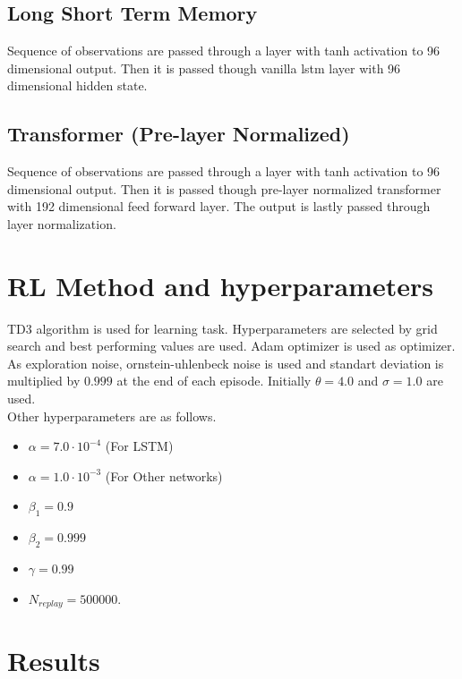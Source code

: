 \subsection{Long Short Term Memory}
Sequence of observations are passed through a layer with tanh activation to 96 dimensional output. Then it is passed though vanilla lstm layer with 96 dimensional hidden state.

\subsection{Transformer (Pre-layer Normalized)}
Sequence of observations are passed through a layer with tanh activation to 96 dimensional output. Then it is passed though pre-layer normalized transformer with 192 dimensional feed forward layer. The output is lastly passed through layer normalization.


\section{RL Method and hyperparameters}
TD3 algorithm is used for learning task. Hyperparameters are selected by grid search and best performing values are used. Adam optimizer is used as optimizer. \\
As exploration noise, ornstein-uhlenbeck noise is used and standart deviation is multiplied  by $0.999$ at the end of each episode. Initially $\theta=4.0$ and $\sigma=1.0$ are used. \\
Other hyperparameters are as follows. \\
\begin{itemize}
	\item $\alpha=7.0 \cdot 10^{-4}$ (For LSTM)
	\item $\alpha=1.0 \cdot 10^{-3}$ (For Other networks)
	\item $\beta_1=0.9$
	\item $\beta_2=0.999$
	\item $\gamma=0.99$
	\item $N_{replay} = 500000$.
\end{itemize}

\section{Results}
